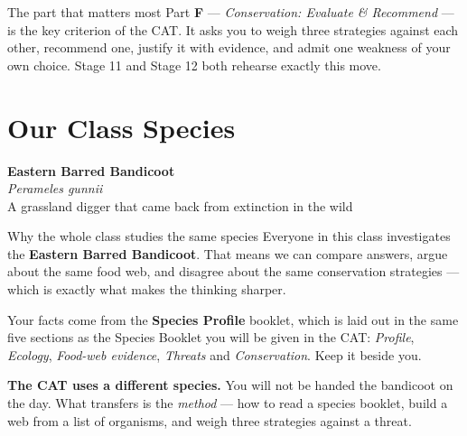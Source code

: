 \documentclass[11pt,a4paper]{article}
\begin{document}
\begin{contextbox}{The part that matters most}
Part \textbf{F} --- \emph{Conservation: Evaluate \& Recommend} --- is the key criterion of the CAT. It asks you to weigh three strategies against each other, recommend one, justify it with evidence, and admit one weakness of your own choice. Stage 11 and Stage 12 both rehearse exactly this move.
\end{contextbox}

\newpage

\section*{Our Class Species}

\begin{center}
  {\headingfont\bfseries\color{ForestDark}\fontsize{24}{28}\selectfont Eastern Barred Bandicoot}\\[4pt]
  {\itshape\color{Forest}\Large Perameles gunnii}\\[6pt]
  {\color{DarkGrey}\small A grassland digger that came back from extinction in the wild}
\end{center}

\medskip

\begin{contextbox}{Why the whole class studies the same species}
Everyone in this class investigates the \textbf{Eastern Barred Bandicoot}. That means we can compare answers, argue about the same food web, and disagree about the same conservation strategies --- which is exactly what makes the thinking sharper.

\medskip
Your facts come from the \textbf{Species Profile} booklet, which is laid out in the same five sections as the Species Booklet you will be given in the CAT: \emph{Profile}, \emph{Ecology}, \emph{Food-web evidence}, \emph{Threats} and \emph{Conservation}. Keep it beside you.

\medskip
\textbf{The CAT uses a different species.} You will not be handed the bandicoot on the day. What transfers is the \emph{method} --- how to read a species booklet, build a web from a list of organisms, and weigh three strategies against a threat.
\end{contextbox}

\bigskip
\end{document}
